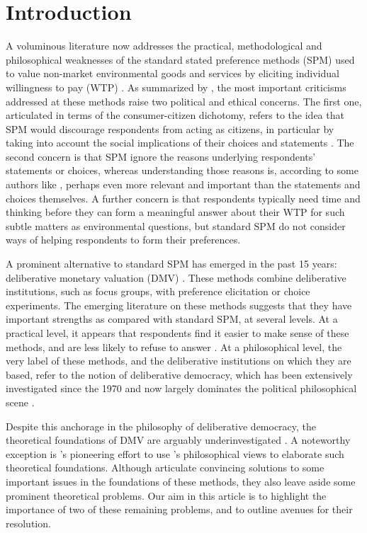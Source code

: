 \documentclass[version=3.21, pagesize, twoside=off, bibliography=totoc, DIV=calc, fontsize=12pt, a4paper, french, english]{scrartcl}
\begin{document}
\section{Introduction}

A voluminous literature now addresses the practical, methodological and philosophical weaknesses of the standard stated preference methods (SPM) used to value non-market environmental goods and services by eliciting individual willingness to pay (WTP) \citep{meinard_ethical_2016} . 
As summarized by \citet{bartkowski_beyond_2018,bartkowski_deliberative_2019}, the most important criticisms addressed at these methods raise two political and ethical concerns. 
The first one, articulated in terms of the consumer-citizen dichotomy, refers to the idea that SPM would discourage respondents from acting as citizens, in particular by taking into account the social implications of their  choices and statements \citep{soma_representing_2014, vatn_institutional_2009}. 
The second concern is that SPM ignore the reasons underlying respondents' statements or choices, whereas understanding those reasons is, according to some authors like \citet{sen_environmental_1995}, perhaps even more relevant and important than the statements and choices themselves. A further concern is that respondents typically need time and thinking before they can form a meaningful answer about their WTP for such subtle matters as environmental questions, but standard SPM do not consider ways of helping respondents to form their preferences.

A prominent alternative to standard SPM has emerged in the past 15 years: deliberative monetary valuation (DMV) \citep{spash_deliberative_2007,bartkowski_economic_2017}. 
These methods combine deliberative institutions, such as focus groups, with preference elicitation or choice experiments. 
The emerging literature on these methods suggests that they have important strengths as compared with standard SPM, at several levels. 
At a practical level, it appears that respondents find it easier to make sense of these methods, and are less likely to refuse to answer \citep{lienhoop_contingent_2007,szabo_reducing_2011}. 
At a philosophical level, the very label of these methods, and the deliberative institutions on which they are based, refer to the notion of deliberative democracy, which has been extensively investigated since the 1970 and now largely dominates the political philosophical scene \citep{chappell_deliberative_2012}.

Despite this anchorage in the philosophy of deliberative democracy, the theoretical foundations of DMV are arguably underinvestigated \citep{bartkowski_economic_2017,bartkowski_beyond_2018,bunse_what_2015,kenter_what_2015}. 
A noteworthy exception is \citet{bartkowski_beyond_2018}'s pioneering effort to use \citet{sen_idea_2009}'s philosophical views to elaborate such theoretical foundations. 
Although \citet{bartkowski_beyond_2018} articulate convincing solutions to some important issues in the foundations of these methods, they also leave aside some prominent theoretical problems. 
Our aim in this article is to highlight the importance of two of these remaining problems, and to outline avenues for their resolution.
\end{document}
